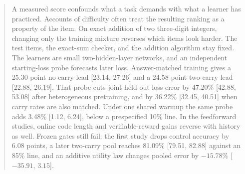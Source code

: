 \begin{abstract}
A measured score confounds what a task demands with what a learner has practiced.
Accounts of difficulty often treat the resulting ranking as a property of the item.
On exact addition of two three-digit integers, changing only the training mixture reverses which items look harder.
The test items, the exact-sum checker, and the addition algorithm stay fixed.
The learners are small two-hidden-layer networks, and an independent starting-loss probe forecasts later loss.
Answer-matched training gives a 25.30-point no-carry lead [23.14, 27.26] and a 24.58-point two-carry lead [22.88, 26.19].
That probe cuts joint held-out loss error by 47.20\% [42.88, 53.08] after heterogeneous pretraining, and by 36.22\% [32.45, 40.51] when carry rates are also matched.
Under one shared warmup the same probe adds 3.48\% [1.12, 6.24], below a prespecified 10\% line.
In the feedforward studies, online code length and verifiable-reward gains reverse with history as well.
Frozen gates still fail: the first study drops control accuracy by 6.08 points, a later two-carry pool reaches 81.09\% [79.51, 82.88] against an 85\% line, and an additive utility law changes pooled error by $-15.78\%$ [$-35.91$, $3.15$].

\end{abstract}

